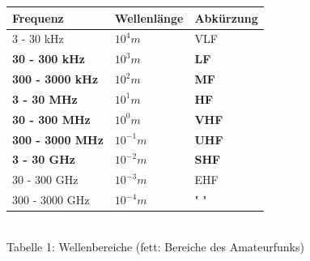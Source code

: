 \begin{frame}
	\begin{center}
	    \begin{Large}
	        \begin{tabular}{|l|l|l|}
	        	\hline
                Frequenz & Wellenlänge & Abkürzung\\
	        	\hline \hline
                3 - 30 kHz     & $10^{4}m$    & VLF \\ \hline
                \textbf{30 - 300 kHz}   & \textbf{$10^{3}m$}      & \textbf{LF}  \\ \hline
                \textbf{300 - 3000 kHz} & \textbf{$10^{2}m$}     & \textbf{MF}  \\ \hline
                \textbf{3 - 30 MHz}     & \textbf{$10^{1}m$}      & \textbf{HF}  \\ \hline
                \textbf{30 - 300 MHz}   & \textbf{$10^{0}m$}          & \textbf{VHF} \\ \hline
                \textbf{300 - 3000 MHz} & \textbf{$10^{-1}m$}      & \textbf{UHF} \\ \hline
                \textbf{3 - 30 GHz}     & \textbf{$10^{-2}m$}     & \textbf{SHF} \\ \hline
                30 - 300 GHz   & $10^{-3}m$     & EHF \\ \hline
                300 - 3000 GHz & $10^{-4}m$ & " " \\ \hline
            \end{tabular}\\[1em]
            {\scriptsize Tabelle 1: Wellenbereiche (fett: Bereiche des Amateurfunks)}
        \end{Large}		
	\end{center}
\end{frame}

